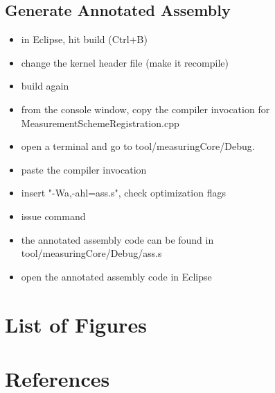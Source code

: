 \documentclass[a4paper,12pt]{article}
\begin{document}
\subsection{Generate Annotated Assembly}
\begin{itemize}
\item in Eclipse, hit build (Ctrl+B)
\item change the kernel header file (make it recompile)
\item build again
\item from the console window, copy the compiler invocation for
MeasurementSchemeRegistration.cpp
\item open a terminal and go to tool/measuringCore/Debug.
\item paste the compiler invocation
\item insert "-Wa,-ahl=ass.s", check optimization flags
\item issue command
\item the annotated assembly code can be found in tool/measuringCore/Debug/ass.s
\item open the annotated assembly code in Eclipse
\end{itemize}

\newpage
\section{List of Figures}
\renewcommand{\listfigurename}{}
\vskip -1cm
\listoffigures

\newpage
\renewcommand\refname{\vskip -1cm}
\section{References}


\end{document}
